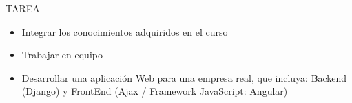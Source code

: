 TAREA
\begin{itemize}		
	\item Integrar los conocimientos adquiridos en el curso
        \item Trabajar en equipo
        \item Desarrollar una aplicación Web para una empresa real, que incluya: Backend (Django) y FrontEnd (Ajax / Framework JavaScript: Angular)
\end{itemize}
